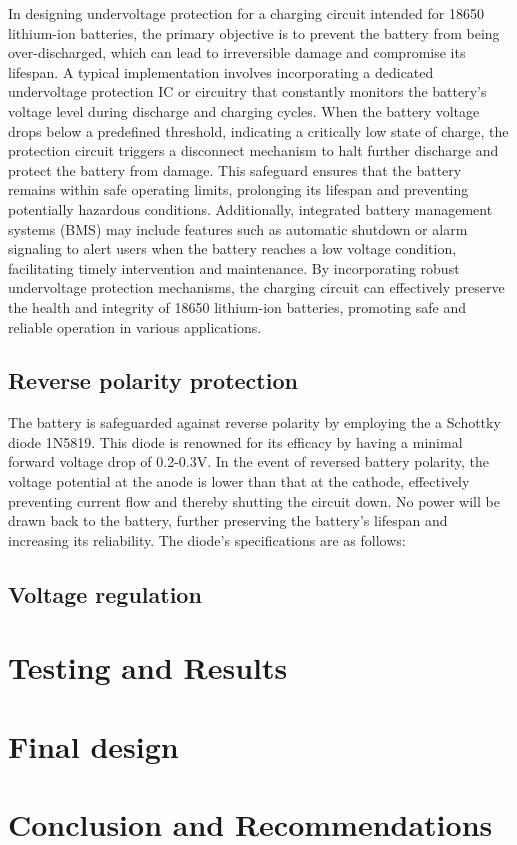 \documentclass[class=report,11pt,crop=false]{standalone}
\begin{document}
	
	In designing undervoltage protection for a charging circuit intended for 18650 lithium-ion batteries, the primary objective is to prevent the battery from being over-discharged, which can lead to irreversible damage and compromise its lifespan. A typical implementation involves incorporating a dedicated undervoltage protection IC or circuitry that constantly monitors the battery's voltage level during discharge and charging cycles. When the battery voltage drops below a predefined threshold, indicating a critically low state of charge, the protection circuit triggers a disconnect mechanism to halt further discharge and protect the battery from damage. This safeguard ensures that the battery remains within safe operating limits, prolonging its lifespan and preventing potentially hazardous conditions. Additionally, integrated battery management systems (BMS) may include features such as automatic shutdown or alarm signaling to alert users when the battery reaches a low voltage condition, facilitating timely intervention and maintenance. By incorporating robust undervoltage protection mechanisms, the charging circuit can effectively preserve the health and integrity of 18650 lithium-ion batteries, promoting safe and reliable operation in various applications.
	
	
	\subsection{Reverse polarity protection}
	\vspace{0.5cm}

	The battery is safeguarded against reverse polarity by employing the a Schottky diode 1N5819. This diode is renowned for its efficacy by having a minimal forward voltage drop of 0.2-0.3V. In the event of reversed battery polarity, the voltage potential at the anode is lower than that at the cathode, effectively preventing current flow and thereby shutting the circuit down. No power will be drawn back to the battery, further preserving the battery's lifespan and increasing its reliability. The diode's specifications are as follows:
	
	
	\subsection{Voltage regulation}
	\section{Testing and Results}
	\section{Final design}
	\section{Conclusion and Recommendations}
	
\end{document}
